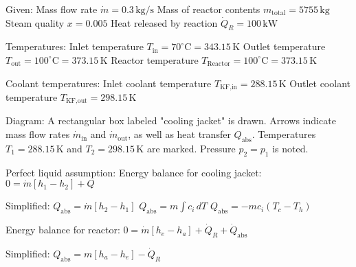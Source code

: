 Given:  
Mass flow rate \( \dot{m} = 0.3 \, \text{kg/s} \)  
Mass of reactor contents \( m_{\text{total}} = 5755 \, \text{kg} \)  
Steam quality \( x = 0.005 \)  
Heat released by reaction \( \dot{Q}_R = 100 \, \text{kW} \)  

Temperatures:  
Inlet temperature \( T_{\text{in}} = 70^\circ \text{C} = 343.15 \, \text{K} \)  
Outlet temperature \( T_{\text{out}} = 100^\circ \text{C} = 373.15 \, \text{K} \)  
Reactor temperature \( T_{\text{Reactor}} = 100^\circ \text{C} = 373.15 \, \text{K} \)  

Coolant temperatures:  
Inlet coolant temperature \( T_{\text{KF,in}} = 288.15 \, \text{K} \)  
Outlet coolant temperature \( T_{\text{KF,out}} = 298.15 \, \text{K} \)  

Diagram:  
A rectangular box labeled "cooling jacket" is drawn.  
Arrows indicate mass flow rates \( \dot{m}_{\text{in}} \) and \( \dot{m}_{\text{out}} \), as well as heat transfer \( Q_{\text{abs}} \).  
Temperatures \( T_1 = 288.15 \, \text{K} \) and \( T_2 = 298.15 \, \text{K} \) are marked.  
Pressure \( p_2 = p_1 \) is noted.

Perfect liquid assumption:  
Energy balance for cooling jacket:  
\( 0 = \dot{m} [ h_1 - h_2 ] + Q \)  

Simplified:  
\( Q_{\text{abs}} = \dot{m} [ h_2 - h_1 ] \)  
\( Q_{\text{abs}} = m \int c_i \, dT \)  
\( Q_{\text{abs}} = -m c_i (T_c - T_h) \)  

Energy balance for reactor:  
\( 0 = \dot{m} [ h_e - h_a ] + \dot{Q}_R + \dot{Q}_{\text{abs}} \)  

Simplified:  
\( Q_{\text{abs}} = m [ h_a - h_e ] - \dot{Q}_R \)